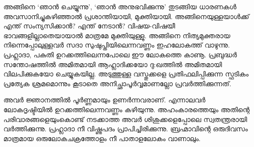 അങ്ങിനെ ‘ഞാന്‍ ചെയ്യുന്നു’, ‘ഞാന്‍ അനുഭവിക്കുന്നു’ തുടങ്ങിയ ധാരണകള്‍ അവസാനിച്ചുകഴിഞ്ഞാല്‍ പ്രശാന്തിയായി, മുക്തിയായി. അങ്ങിനെയുള്ളയാള്‍ക്ക് എന്ത് സംന്യസിക്കാന്‍? എന്ത് നേടാന്‍? വിഷയ-വിഷയീ ഭാവങ്ങളില്ലാതെയായാല്‍ മാത്രമേ മുക്തിയുള്ളു. അങ്ങിനെ നിത്യമുക്തരായ നിന്നെപ്പോലുള്ളവര്‍ സദാ സുഷുപ്തിയിലെന്നവണ്ണം ഇഹലോകത്ത് വാഴുന്നു. പ്രഹ്ലാദാ, പകുതി ഉറക്കത്തിലെന്നപോലെ ഈ ലോകത്തെ കാണൂ. പ്രബുദ്ധര്‍ സന്തോഷത്തില്‍ അമിതമായി ആഹ്ലാദിക്കയോ ദു:ഖത്തില്‍ അമിതമായി വിലപിക്കുകയോ ചെയ്യുകയില്ല. അടുത്തുള്ള വസ്തുക്കളെ പ്രതിഫലിപ്പിക്കുന്ന സ്ഫടികം പ്രത്യേക ശ്രമമൊന്നും കൂടാതെ അനിച്ഛാപൂര്‍വ്വമാണല്ലോ പ്രവര്‍ത്തിക്കുന്നത്.

അവര്‍ ജ്ഞാനത്തില്‍ പൂര്‍ണ്ണമായും ഉണര്‍ന്നവരാണ്. എന്നാലവര്‍ ലോകദൃഷ്ടിയില്‍ ഉറക്കത്തിലെന്നവണ്ണം കഴിയുന്നു. അഹംകാരത്തെയും അതിന്റെ പരിവാരങ്ങളെയുംകൊണ്ട് നടക്കാത്ത അവര്‍ ശിശുക്കളെപ്പോലെ സ്വതന്ത്രരായി വര്‍ത്തിക്കുന്നു. പ്രഹ്ലാദാ നീ വിഷ്ണുപദം പ്രാപിച്ചിരിക്കുന്നു. ബ്രഹ്മാവിന്റെ ഒരുദിവസം മാത്രമായ ഒരുലോകചക്രത്തോളം നീ പാതാളലോകം വാണാലും. 